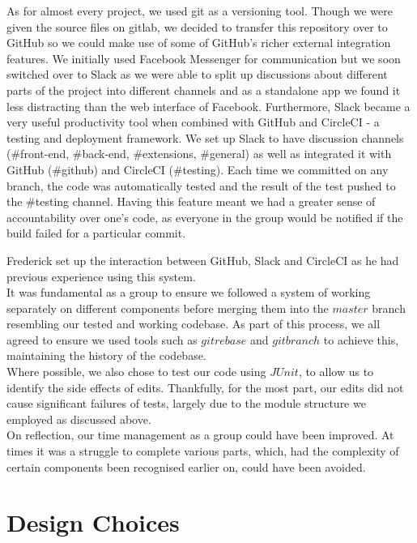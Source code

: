 \documentclass[a4paper, 11pt]{article} %
\begin{document}
As for almost every project, we used git as a versioning tool. Though we were given the source files on gitlab, we decided to transfer this repository over to GitHub so we could make use of some of GitHub's richer external integration features. We initially used Facebook Messenger for communication but we soon switched over to Slack as we were able to split up discussions about different parts of the project into different channels and as a standalone app we found it less distracting than the web interface of Facebook. Furthermore, Slack became a very useful productivity tool when combined with GitHub and CircleCI - a testing and deployment framework. We set up Slack to have discussion channels (\#front-end, \#back-end, \#extensions, \#general) as well as integrated it with GitHub (\#github) and CircleCI (\#testing). Each time we committed on any branch, the code was automatically tested and the result of the test pushed to the \#testing channel. Having this feature meant we had a greater sense of accountability over one's code, as everyone in the group would be notified if the build failed for a particular commit.

Frederick set up the interaction between GitHub, Slack and CircleCI as he had previous experience using this system. \\
It was fundamental as a group to ensure we followed a system of working separately on different components before merging them into the $ master $ branch resembling our tested and working codebase. As part of this process, we all agreed to ensure we used tools such as $ git rebase $ and $ git branch $ to achieve this, maintaining the history of the codebase. \\

Where possible, we also chose to test our code using $ JUnit $, to allow us to identify the side effects of edits. Thankfully, for the most part, our edits did not cause significant failures of tests, largely due to the module structure we employed as discussed above. \\

On reflection, our time management as a group could have been improved. At times it was a struggle to complete various parts, which, had the complexity of certain components been recognised earlier on, could have been avoided.

\section*{Design Choices}
\end{document}
